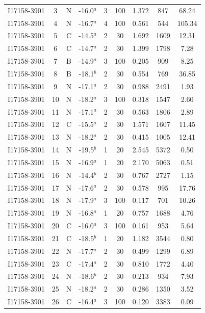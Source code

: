\begin{table}
\begin{tabular}{ccccccccc}
I17158-3901 & 3 & N & -16.0$^{a}$ & 3 & 100 & 1.372 & 847 & 68.24 \\
I17158-3901 & 4 & N & -16.7$^{a}$ & 4 & 100 & 0.561 & 544 & 105.34 \\
I17158-3901 & 5 & C & -14.5$^{a}$ & 2 & 30 & 1.692 & 1609 & 12.31 \\
I17158-3901 & 6 & C & -14.7$^{a}$ & 2 & 30 & 1.399 & 1798 & 7.28 \\
I17158-3901 & 7 & B & -14.9$^{a}$ & 3 & 100 & 0.205 & 909 & 8.25 \\
I17158-3901 & 8 & B & -18.1$^{b}$ & 2 & 30 & 0.554 & 769 & 36.85 \\
I17158-3901 & 9 & N & -17.1$^{a}$ & 2 & 30 & 0.988 & 2491 & 1.93 \\
I17158-3901 & 10 & N & -18.2$^{a}$ & 3 & 100 & 0.318 & 1547 & 2.60 \\
I17158-3901 & 11 & N & -17.1$^{a}$ & 2 & 30 & 0.563 & 1806 & 2.89 \\
I17158-3901 & 12 & C & -15.5$^{a}$ & 2 & 30 & 1.571 & 1607 & 11.45 \\
I17158-3901 & 13 & N & -18.2$^{a}$ & 2 & 30 & 0.415 & 1005 & 12.41 \\
I17158-3901 & 14 & N & -19.5$^{b}$ & 1 & 20 & 2.545 & 5372 & 0.50 \\
I17158-3901 & 15 & N & -16.9$^{a}$ & 1 & 20 & 2.170 & 5063 & 0.51 \\
I17158-3901 & 16 & N & -14.4$^{b}$ & 2 & 30 & 0.767 & 2727 & 1.15 \\
I17158-3901 & 17 & N & -17.6$^{a}$ & 2 & 30 & 0.578 & 995 & 17.76 \\
I17158-3901 & 18 & N & -17.9$^{a}$ & 3 & 100 & 0.117 & 701 & 10.26 \\
I17158-3901 & 19 & N & -16.8$^{a}$ & 1 & 20 & 0.757 & 1688 & 4.76 \\
I17158-3901 & 20 & C & -16.0$^{a}$ & 3 & 100 & 0.161 & 953 & 5.64 \\
I17158-3901 & 21 & C & -18.5$^{b}$ & 1 & 20 & 1.182 & 3544 & 0.80 \\
I17158-3901 & 22 & N & -17.7$^{a}$ & 2 & 30 & 0.499 & 1299 & 6.89 \\
I17158-3901 & 23 & C & -17.4$^{a}$ & 2 & 30 & 0.810 & 1772 & 4.40 \\
I17158-3901 & 24 & N & -18.6$^{b}$ & 2 & 30 & 0.213 & 934 & 7.93 \\
I17158-3901 & 25 & N & -18.2$^{a}$ & 2 & 30 & 0.286 & 1350 & 3.52 \\
I17158-3901 & 26 & C & -16.4$^{a}$ & 3 & 100 & 0.120 & 3383 & 0.09 \\

\end{tabular}
\end{table}
